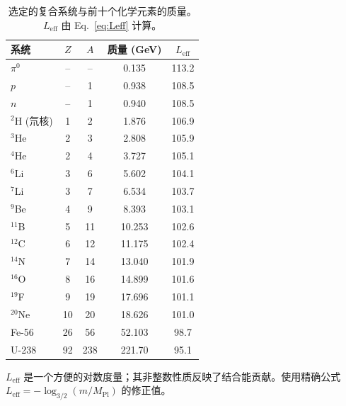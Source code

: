 \documentclass[11pt,a4paper]{article}
\begin{document}
	\begin{table}[H]
		\centering
		\caption{选定的复合系统与前十个化学元素的质量。\(L_{\mathrm{eff}}\) 由 Eq.~\eqref{eq:Leff} 计算。}
		\label{tab:composite}
		\small
		\begin{tabular}{l c c c c}
			\toprule
			系统 & \(Z\) & \(A\) & 质量 (GeV) & \(L_{\mathrm{eff}}\) \\
			\midrule
			\(\pi^0\) & – & – & 0.135 & 113.2 \\
			\(p\) & – & 1 & 0.938 & 108.5 \\
			\(n\) & – & 1 & 0.940 & 108.5 \\
			\(^2\)H (氘核) & 1 & 2 & 1.876 & 106.9 \\
			\(^3\)He & 2 & 3 & 2.808 & 105.9 \\
			\(^4\)He & 2 & 4 & 3.727 & 105.1 \\
			\(^6\)Li & 3 & 6 & 5.602 & 104.1 \\
			\(^7\)Li & 3 & 7 & 6.534 & 103.7 \\
			\(^9\)Be & 4 & 9 & 8.393 & 103.1 \\
			\(^{11}\)B & 5 & 11 & 10.253 & 102.6 \\
			\(^{12}\)C & 6 & 12 & 11.175 & 102.4 \\
			\(^{14}\)N & 7 & 14 & 13.040 & 101.9 \\
			\(^{16}\)O & 8 & 16 & 14.899 & 101.6 \\
			\(^{19}\)F & 9 & 19 & 17.696 & 101.1 \\
			\(^{20}\)Ne & 10 & 20 & 18.626 & 101.0 \\
			Fe-56 & 26 & 56 & 52.103 & 98.7 \\
			U-238 & 92 & 238 & 221.70 & 95.1 \\
			\bottomrule
		\end{tabular}
		\par\smallskip
		\footnotesize \(L_{\mathrm{eff}}\) 是一个方便的对数度量；其非整数性质反映了结合能贡献。使用精确公式 \(L_{\mathrm{eff}} = -\log_{3/2}(m/M_{\mathrm{Pl}})\) 的修正值。
	\end{table}
	
\end{document}

